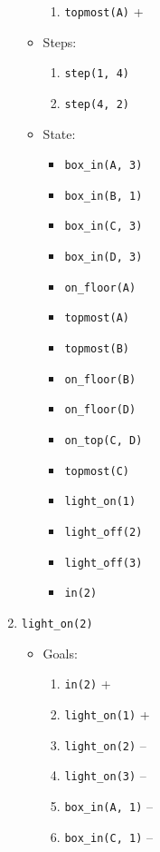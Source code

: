 \documentclass[12pt]{article}
\begin{document}
\begin{enumerate}
\begin{itemize}
\begin{enumerate}
          \item \texttt{topmost(A)} +
        \end{enumerate}
      \item Steps:
        \begin{enumerate}
          \item \texttt{step(1, 4)}
          \item \texttt{step(4, 2)}
        \end{enumerate}
      \item State:
        \begin{itemize}
          \item \texttt{box\_in(A, 3)}
          \item \texttt{box\_in(B, 1)}
          \item \texttt{box\_in(C, 3)}
          \item \texttt{box\_in(D, 3)}
          \item \texttt{on\_floor(A)}
          \item \texttt{topmost(A)}
          \item \texttt{topmost(B)}
          \item \texttt{on\_floor(B)}
          \item \texttt{on\_floor(D)}
          \item \texttt{on\_top(C, D)}
          \item \texttt{topmost(C)}
          \item \texttt{light\_on(1)}
          \item \texttt{light\_off(2)}
          \item \texttt{light\_off(3)}
          \item \texttt{in(2)}
        \end{itemize}
    \end{itemize}
  \item \texttt{light\_on(2)}
    \begin{itemize}
      \item Goals:
        \begin{enumerate}
          \item \texttt{in(2)} +
          \item \texttt{light\_on(1)} +
          \item \texttt{light\_on(2)} --
          \item \texttt{light\_on(3)} --
          \item \texttt{box\_in(A, 1)} --
          \item \texttt{box\_in(C, 1)} --

\end{enumerate}
\end{itemize}
\end{enumerate}
\end{document}
